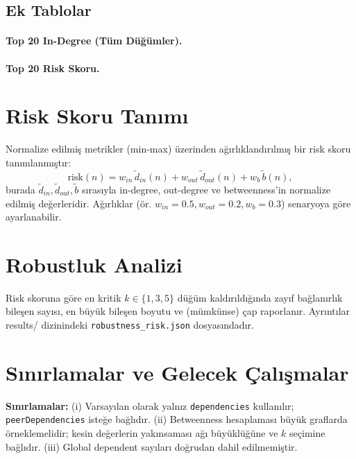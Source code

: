 \documentclass[11pt,a4paper]{article}
\begin{document}
\subsection{Ek Tablolar}
\paragraph{Top 20 In-Degree (Tüm Düğümler).}

\paragraph{Top 20 Risk Skoru.}

\section{Risk Skoru Tanımı}
Normalize edilmiş metrikler (min‑max) üzerinden ağırlıklandırılmış bir risk skoru tanımlanmıştır:
\[
\mathrm{risk}(n) = w_{in}\,\tilde{d}_{in}(n) + w_{out}\,\tilde{d}_{out}(n) + w_{b}\,\tilde{b}(n),
\]
burada $\tilde{d}_{in},\tilde{d}_{out},\tilde{b}$ sırasıyla in-degree, out-degree ve betweenness'in normalize edilmiş değerleridir. Ağırlıklar (ör. $w_{in}=0.5, w_{out}=0.2, w_{b}=0.3$) senaryoya göre ayarlanabilir.

\section{Robustluk Analizi}
Risk skoruna göre en kritik $k\in\{1,3,5\}$ düğüm kaldırıldığında zayıf bağlanırlık bileşen sayısı, en büyük bileşen boyutu ve (mümkünse) çap raporlanır. Ayrıntılar results/ dizinindeki \texttt{robustness\_risk.json} dosyasındadır.

\section{Sınırlamalar ve Gelecek Çalışmalar}
\textbf{Sınırlamalar:} (i) Varsayılan olarak yalnız \texttt{dependencies} kullanılır; \texttt{peerDependencies} isteğe bağlıdır. (ii) Betweenness hesaplaması büyük graflarda örneklemelidir; kesin değerlerin yakınsaması ağı büyüklüğüne ve $k$ seçimine bağlıdır. (iii) Global dependent sayıları doğrudan dahil edilmemiştir.
\end{document}
